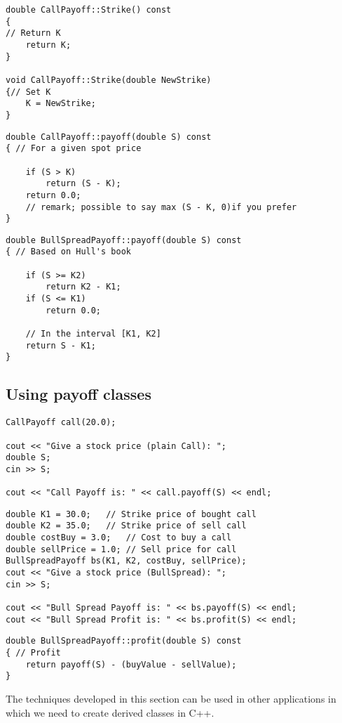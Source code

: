 \begin{lstlisting}
double CallPayoff::Strike() const
{
// Return K
	return K;
}

void CallPayoff::Strike(double NewStrike)
{// Set K
	K = NewStrike;
}
\end{lstlisting}

\begin{lstlisting}
double CallPayoff::payoff(double S) const
{ // For a given spot price

	if (S > K)
		return (S - K);
	return 0.0;
	// remark; possible to say max (S - K, 0)if you prefer
}
\end{lstlisting}

\begin{lstlisting}
double BullSpreadPayoff::payoff(double S) const
{ // Based on Hull's book

	if (S >= K2)
		return K2 - K1;
	if (S <= K1)
		return 0.0;

	// In the interval [K1, K2]
	return S - K1;
}
\end{lstlisting}

\subsection{Using payoff classes}

\begin{lstlisting}
CallPayoff call(20.0);

cout << "Give a stock price (plain Call): ";
double S;
cin >> S;

cout << "Call Payoff is: " << call.payoff(S) << endl;
\end{lstlisting}

\begin{lstlisting}
double K1 = 30.0;	// Strike price of bought call
double K2 = 35.0;	// Strike price of sell call
double costBuy = 3.0;	// Cost to buy a call
double sellPrice = 1.0; // Sell price for call
BullSpreadPayoff bs(K1, K2, costBuy, sellPrice);
cout << "Give a stock price (BullSpread): ";
cin >> S;

cout << "Bull Spread Payoff is: " << bs.payoff(S) << endl;
cout << "Bull Spread Profit is: " << bs.profit(S) << endl;
\end{lstlisting}

\begin{lstlisting}
double BullSpreadPayoff::profit(double S) const
{ // Profit
	return payoff(S) - (buyValue - sellValue);
}
\end{lstlisting}
The techniques developed in this section can be used in other applications in which we need to create derived classes in C++.


